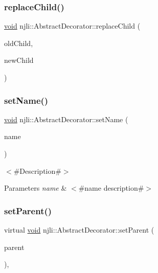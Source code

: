 \subsubsection{\texorpdfstring{replace\+Child()}{replaceChild()}}
{\footnotesize\ttfamily \mbox{\hyperlink{_thread_8h_af1e856da2e658414cb2456cb6f7ebc66}{void}} njli\+::\+Abstract\+Decorator\+::replace\+Child (\begin{DoxyParamCaption}\item[{\mbox{\hyperlink{classnjli_1_1_abstract_decorator}{Abstract\+Decorator}} $\ast$}]{old\+Child,  }\item[{\mbox{\hyperlink{classnjli_1_1_abstract_decorator}{Abstract\+Decorator}} $\ast$}]{new\+Child }\end{DoxyParamCaption})\hspace{0.3cm}{\ttfamily [protected]}}

\mbox{\label{classnjli_1_1_abstract_decorator_a087eb5f8d9f51cc476f12f1d10a3cb95}} 
\subsubsection{\texorpdfstring{set\+Name()}{setName()}}
{\footnotesize\ttfamily \mbox{\hyperlink{_thread_8h_af1e856da2e658414cb2456cb6f7ebc66}{void}} njli\+::\+Abstract\+Decorator\+::set\+Name (\begin{DoxyParamCaption}\item[{const char $\ast$}]{name }\end{DoxyParamCaption})}

$<$\#\+Description\#$>$


\begin{DoxyParams}{Parameters}
{\em name} & $<$\#name description\#$>$ \\
\hline
\end{DoxyParams}
\mbox{\label{classnjli_1_1_abstract_decorator_a292c49c95d3fd287d0e4799554288520}} 
\subsubsection{\texorpdfstring{set\+Parent()}{setParent()}}
{\footnotesize\ttfamily virtual \mbox{\hyperlink{_thread_8h_af1e856da2e658414cb2456cb6f7ebc66}{void}} njli\+::\+Abstract\+Decorator\+::set\+Parent (\begin{DoxyParamCaption}\item[{\mbox{\hyperlink{classnjli_1_1_abstract_decorator}{Abstract\+Decorator}} $\ast$}]{parent }\end{DoxyParamCaption})\hspace{0.3cm}{\ttfamily [protected]}, {\ttfamily [virtual]}}


